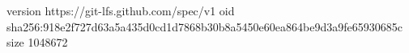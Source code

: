 version https://git-lfs.github.com/spec/v1
oid sha256:918e2f727d63a5a435d0cd1d7868b30b8a5450e60ea864be9d3a9fe65930685c
size 1048672
